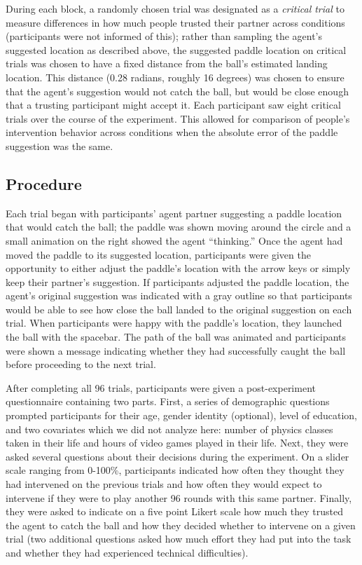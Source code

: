 \documentclass[10pt,letterpaper]{article}
\begin{document}
During each block, a randomly chosen trial was designated as a \textit{critical trial} to measure differences in how much people trusted their partner across conditions (participants were not informed of this); rather than sampling the agent's suggested location as described above, the suggested paddle location on critical trials was chosen to have a fixed distance from the ball's estimated landing location. This distance (0.28 radians, roughly 16 degrees) was chosen to ensure that the agent's suggestion would not catch the ball, but would be close enough that a trusting participant might accept it. Each participant saw eight critical trials over the course of the experiment. This allowed for comparison of people's intervention behavior across conditions when the absolute error of the paddle suggestion was the same. 


\subsection{Procedure}
Each trial began with participants' agent partner suggesting a paddle location that would catch the ball; the paddle was shown moving around the circle and a small animation on the right showed the agent ``thinking.'' Once the agent had moved the paddle to its suggested location, participants were given the opportunity to either adjust the paddle's location with the arrow keys or simply keep their partner's suggestion. If participants adjusted the paddle location, the agent's original suggestion was indicated with a gray outline so that participants would be able to see how close the ball landed to the original suggestion on each trial. When participants were happy with the paddle's location, they launched the ball with the spacebar. The path of the ball was animated and participants were shown a message indicating whether they had successfully caught the ball before proceeding to the next trial. 

After completing all 96 trials, participants were given a post-experiment questionnaire containing two parts. First, a series of demographic questions prompted participants for their age, gender identity (optional), level of education, and two covariates which we did not analyze here: number of physics classes taken in their life and hours of video games played in their life. Next, they were asked several questions about their decisions during the experiment. On a slider scale ranging from 0-100\%, participants indicated how often they thought they had intervened on the previous trials and how often they would expect to intervene if they were to play another 96 rounds with this same partner. Finally, they were asked to indicate on a five point Likert scale how much they trusted the agent to catch the ball and how they decided whether to intervene on a given trial (two additional questions asked how much effort they had put into the task and whether they had experienced technical difficulties).
\end{document}
